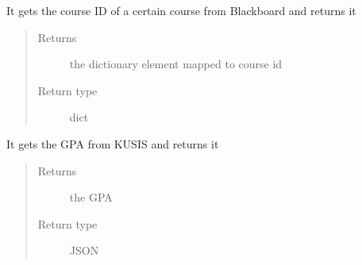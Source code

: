 \documentclass[letterpaper,10pt,english]{sphinxmanual}
\begin{document}

\begin{fulllineitems}
\label{\detokenize{main:main.getCourseID}}
\pysigstartsignatures
{}
\pysigstopsignatures
\sphinxAtStartPar
It gets the course ID of a certain course from Blackboard and returns it
\begin{quote}\begin{description}
\item[{Returns}] \leavevmode
\sphinxAtStartPar
the dictionary element mapped to course id

\item[{Return type}] \leavevmode
\sphinxAtStartPar
dict

\end{description}\end{quote}

\end{fulllineitems}


\begin{fulllineitems}
\label{\detokenize{main:main.getGPA}}
\pysigstartsignatures
{}
\pysigstopsignatures
\sphinxAtStartPar
It gets the GPA from KUSIS and returns it
\begin{quote}\begin{description}
\item[{Returns}] \leavevmode
\sphinxAtStartPar
the GPA

\item[{Return type}] \leavevmode
\sphinxAtStartPar
JSON

\end{description}\end{quote}

\end{fulllineitems}

\end{document}
